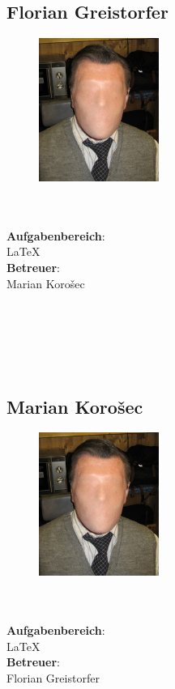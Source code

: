 \subsection*{Florian Greistorfer}
\begin{figure}
\begin{center}
  \includegraphics[width=0.35\textwidth]{fig/face}
\end{center}
\end{figure}
\mbox{}\\
\mbox{}\\
\textbf{Aufgabenbereich}:\\
\LaTeX{}\\
\textbf{Betreuer}:\\
Marian Korošec
\mbox{}\\
\mbox{}\\
\mbox{}\\
\mbox{}\\
\mbox{}\\
\mbox{}\\

\subsection*{Marian Korošec}
\begin{figure}
\begin{center}
  \includegraphics[width=0.35\textwidth]{fig/face}
\end{center}
\end{figure}
\mbox{}\\
\mbox{}\\
\textbf{Aufgabenbereich}:\\
\LaTeX{}\\
\textbf{Betreuer}:\\
Florian Greistorfer
\mbox{}\\
\mbox{}\\
\mbox{}\\
\mbox{}\\
\mbox{}\\
\newpage

